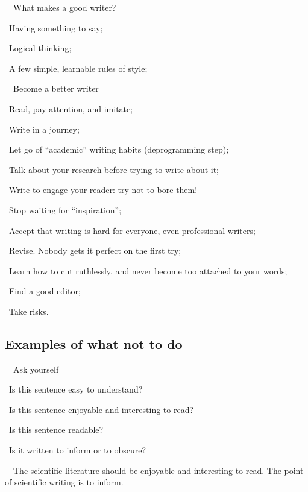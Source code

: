 \documentclass[a4paper, 12pt]{article}
\begin{document}
\par\ \textbullet\ What makes a good writer?
\par\quad\textopenbullet\ Having something to say;
\par\quad\textopenbullet\ Logical thinking;
\par\quad\textopenbullet\ A few simple, learnable rules of style;

\par\ \textbullet\ Become a better writer
\par\quad\textopenbullet\ Read, pay attention, and imitate;
\par\quad\textopenbullet\ Write in a journey;
\par\quad\textopenbullet\ Let go of ``academic'' writing habits (deprogramming step);
\par\quad\textopenbullet\ Talk about your research before trying to write about it;
\par\quad\textopenbullet\ Write to engage your reader: try not to bore them!
\par\quad\textopenbullet\ Stop waiting for ``inspiration'';
\par\quad\textopenbullet\ Accept that writing is hard for everyone, even professional writers;
\par\quad\textopenbullet\ Revise. Nobody gets it perfect on the first try;
\par\quad\textopenbullet\ Learn how to cut ruthlessly, and never become too attached to your words;
\par\quad\textopenbullet\ Find a good editor;
\par\quad\textopenbullet\ Take risks.

\subsection{Examples of what not to do}

\par\ \textbullet\ Ask yourself
\par\quad\textopenbullet\ Is this sentence easy to understand?
\par\quad\textopenbullet\ Is this sentence enjoyable and interesting to read?
\par\quad\textopenbullet\ Is this sentence readable?
\par\quad\textopenbullet\ Is it written to inform or to obscure?

\par\ \textbullet\ The scientific literature should be enjoyable and interesting to read. The point of scientific writing is to inform.
\end{document}
